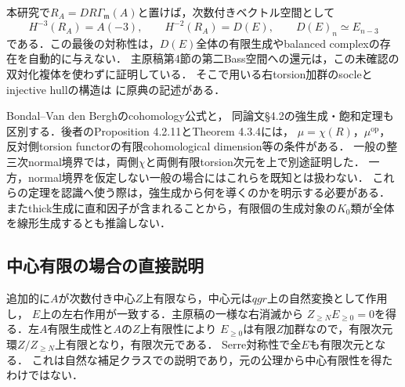 \documentclass[11pt,a4paper]{ltjsarticle}
\begin{document}
本研究で$R_A=D R\Gamma_{\mathfrak m}(A)$と置けば，次数付きベクトル空間として
\[
 H^{-3}(R_A)=A(-3),\qquad H^{-2}(R_A)=D(E),\qquad
 D(E)_n\simeq E_{n-3}
\]
である．この最後の対称性は，$D(E)$全体の有限生成やbalanced complexの存在を自動的に与えない．
主原稿第4節の第二Bass空間への還元は，この未確認の双対化複体を使わずに証明している．
そこで用いる右torsion加群のsocleとinjective hullの構造は
\cite[Proposition 3.12, Lemma 3.14]{Mizuno}に原典の記述がある．

Bondal--Van den Bergh\cite[\S4.1]{BvdBGenerators}のcohomology公式と，
同論文\S4.2の強生成・飽和定理も区別する．後者のProposition 4.2.11とTheorem 4.3.4には，
$\mu=\chi(R)$，$\mu^{\mathrm{op}}$，反対側torsion functorの有限cohomological dimension等の条件がある．
一般の整三次normal境界では，両側$\chi$と両側有限torsion次元を上で別途証明した．
一方，normal境界を仮定しない一般の場合にはこれらを既知とは扱わない．
これらの定理を認識へ使う際は，強生成から何を導くのかを明示する必要がある．
またthick生成に直和因子が含まれることから，有限個の生成対象の$K_0$類が全体を線形生成するとも推論しない．

\subsection{中心有限の場合の直接説明}
追加的に$A$が次数付き中心$Z$上有限なら，中心元は$qgr$上の自然変換として作用し，
$E$上の左右作用が一致する．主原稿の一様な右消滅から
$Z_{\geq N}E_{\geq0}=0$を得る．左$A$有限生成性と$A$の$Z$上有限性により
$E_{\geq0}$は有限$Z$加群なので，有限次元環$Z/Z_{\geq N}$上有限となり，有限次元である．
Serre対称性で全$E$も有限次元となる．
これは自然な補足クラスでの説明であり，元の公理から中心有限性を得たわけではない．
\end{document}
